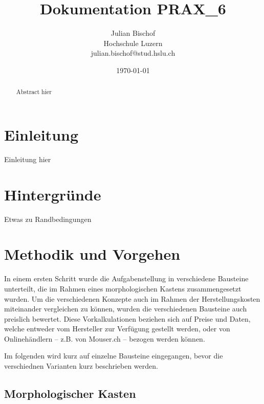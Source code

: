 \documentclass[]{article}
\title{Dokumentation PRAX\_6}
\author{Julian Bischof \\
        Hochschule Luzern \\
        julian.bischof@stud.hslu.ch}
\date{\today}
\begin{document}

\maketitle 
\thispagestyle{empty}

\newpage
\thispagestyle{empty}
\begin{abstract}
    Abstract hier
\end{abstract}
\newpage

\tableofcontents %
\listoffigures %
\listoftables %
\clearpage
\setcounter{page}{0}

\section{Einleitung}

Einleitung hier

\section{Hintergründe}

Etwas zu Randbedingungen

\section{Methodik und Vorgehen}
In einem ersten Schritt wurde die Aufgabenstellung in verschiedene Bausteine unterteilt, 
die im Rahmen eines morphologischen Kastens zusammengesetzt wurden. Um die verschiedenen Konzepte
auch im Rahmen der Herstellungskosten miteinander vergleichen zu können, wurden die verschiedenen Bausteine
auch preislich bewertet. Diese Vorkalkulationen beziehen sich auf Preise und Daten, welche entweder vom Hersteller zur
Verfügung gestellt werden, oder von Onlinehändlern -- z.B. von Mouser.ch -- bezogen werden können.

Im folgenden wird kurz auf einzelne Bausteine eingegangen, bevor die verschiednen Varianten kurz beschrieben werden. 

\subsection{Morphologischer Kasten}
\end{document}
